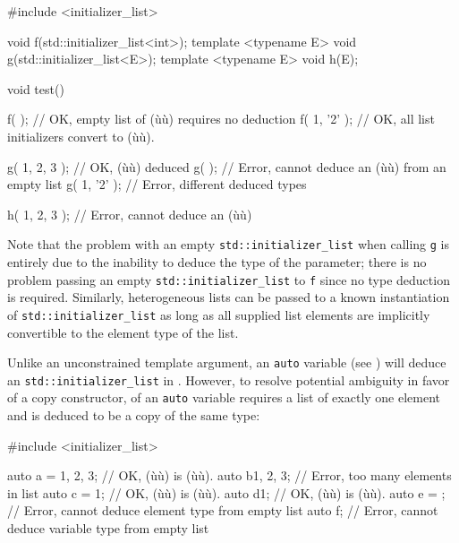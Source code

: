 \begin{emcppslisting}
#include <initializer_list>

void f(std::initializer_list<int>);
template <typename E> void g(std::initializer_list<E>);
template <typename E> void h(E);

void test()
{
    f({ });                 // OK, empty list of (ù{}ù) requires no deduction
    f({ 1, '2' });          // OK, all list initializers convert to (ù{}ù).

    g({ 1, 2, 3 });         // OK, (ù{}ù) deduced
    g({ });                 // Error, cannot deduce an (ù{}ù) from an empty list
    g({ 1, '2' });          // Error, different deduced types

    h({ 1, 2, 3 });         // Error, cannot deduce an (ù{}ù)
}
\end{emcppslisting}
    

\noindent Note that the problem with an empty \lstinline!std::initializer_list! when
calling \lstinline!g! is entirely due to the inability to deduce the type
of the parameter; there is no problem passing an empty
\lstinline!std::initializer_list! to \lstinline!f! since no type deduction is
required. Similarly, heterogeneous lists can be passed to a known
instantiation of \lstinline!std::initializer_list! as long as all supplied
list elements are implicitly convertible to the element type of the
list.

Unlike an unconstrained template argument, an \lstinline!auto! variable
(see ) will deduce an
\lstinline!std::initializer_list! in . However, to resolve potential ambiguity in favor of a
copy constructor,  of an
\lstinline!auto! variable requires a list of exactly one element and is
deduced to be a copy of the same type:

\begin{emcppslisting}
#include <initializer_list>

auto a = {1, 2, 3};  // OK, (ù{}ù) is (ù{}ù).
auto b{1, 2, 3};     // Error, too many elements in list
auto c = {1};        // OK, (ù{}ù) is (ù{}ù).
auto d{1};           // OK, (ù{}ù) is (ù{}ù).
auto e = {};         // Error, cannot deduce element type from empty list
auto f{};            // Error, cannot deduce variable type from empty list
\end{emcppslisting}
    

